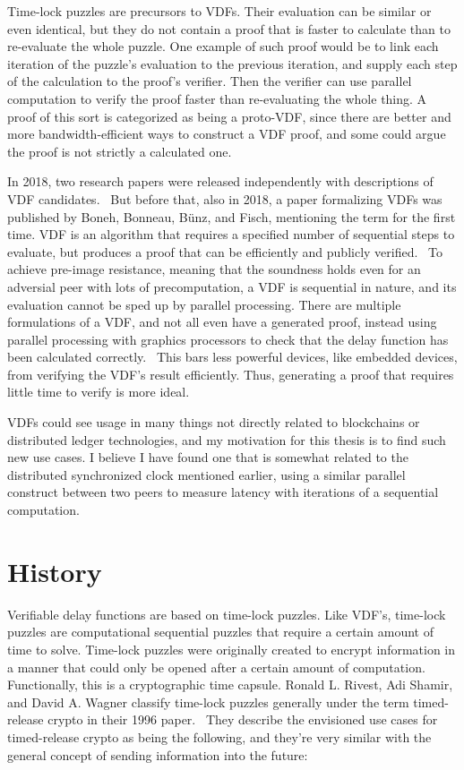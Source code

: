 Time-lock puzzles are precursors to VDFs. Their evaluation can be similar or even identical, but they do not contain a proof that is faster to calculate than to re-evaluate the whole puzzle. One example of such proof would be to link each iteration of the puzzle's evaluation to the previous iteration, and supply each step of the calculation to the proof's verifier. Then the verifier can use parallel computation to verify the proof faster than re-evaluating the whole thing. A proof of this sort is categorized as being a proto-VDF, since there are better and more bandwidth-efficient ways to construct a VDF proof, and some could argue the proof is not strictly a calculated one.

In 2018, two research papers were released independently with descriptions of VDF candidates.~\cite{Wesolowski2018-rf, Pietrzak2018-xs} But before that, also in 2018, a paper formalizing VDFs was published by Boneh, Bonneau, Bünz, and Fisch, mentioning the term for the first time. VDF is an algorithm that requires a specified number of sequential steps to evaluate, but produces a proof that can be efficiently and publicly verified.~\cite{Boneh_undated-ml} To achieve pre-image resistance, meaning that the soundness holds even for an adversial peer with lots of precomputation, a VDF is sequential in nature, and its evaluation cannot be sped up by parallel processing. There are multiple formulations of a VDF, and not all even have a generated proof, instead using parallel processing with graphics processors to check that the delay function has been calculated correctly.~\cite{Yakovenko2018-zn} This bars less powerful devices, like embedded devices, from verifying the VDF's result efficiently. Thus, generating a proof that requires little time to verify is more ideal.~\cite{Boneh_undated-ml}

VDFs could see usage in many things not directly related to blockchains or distributed ledger technologies, and my motivation for this thesis is to find such new use cases. I believe I have found one that is somewhat related to the distributed synchronized clock mentioned earlier, using a similar parallel construct between two peers to measure latency with iterations of a sequential computation.


\section{History}
Verifiable delay functions are based on time-lock puzzles. Like VDF's, time-lock puzzles are computational sequential puzzles that require a certain amount of time to solve.\cite{Rivest_undated-qr} Time-lock puzzles were originally created to encrypt information in a manner that could only be opened after a certain amount of computation. Functionally, this is a cryptographic time capsule. Ronald L. Rivest, Adi Shamir, and David A. Wagner classify time-lock puzzles generally under the term timed-release crypto in their 1996 paper.~\cite{Rivest_undated-qr} They describe the envisioned use cases for timed-release crypto as being the following, and they're very similar with the general concept of sending information into the future:

